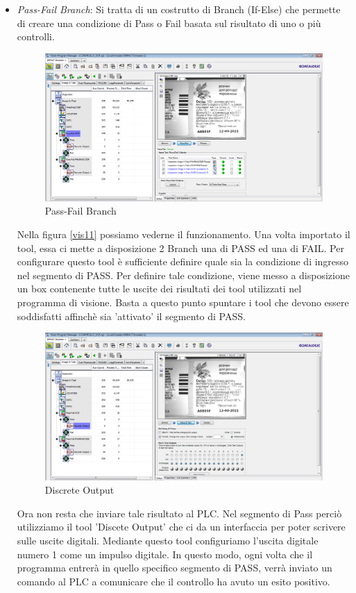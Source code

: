 \documentclass[12pt, a4paper, oneside]{book}
\begin{document}
\begin{itemize}
	\item \textit{Pass-Fail Branch}: Si tratta di un costrutto di Branch (If-Else) che permette di creare una condizione di Pass o Fail basata sul risultato di uno o più controlli.
	
			\begin{figure}[H]
		\centering
		\includegraphics[width=13cm]{Immagini/VIS12}
		\caption{Pass-Fail Branch}
		\label{vis12}
			\end{figure}
		
		Nella figura \ref{vis11} possiamo vederne il funzionamento. Una volta importato il tool, essa ci mette a disposizione 2 Branch una di PASS ed una di FAIL. Per configurare questo tool è sufficiente definire quale sia la condizione di ingresso nel segmento di PASS. Per definire tale condizione, viene messo a disposizione un box contenente tutte le uscite dei risultati dei tool utilizzati nel programma di visione. Basta a questo punto spuntare i tool che devono essere soddisfatti affinchè sia 'attivato' il segmento di PASS.
		
		\begin{figure}[H]
			\centering
			\includegraphics[width=13cm]{Immagini/VIS13}
			\caption{Discrete Output}
			\label{vis13}
		\end{figure}
	
		Ora non resta che inviare tale risultato al PLC. Nel segmento di Pass perciò utilizziamo il tool 'Discete Output' che ci da un interfaccia per poter scrivere sulle uscite digitali. Mediante questo tool configuriamo l'uscita digitale numero 1 come un impulso digitale. In questo modo, ogni volta che il programma entrerà in quello specifico segmento di PASS, verrà inviato un comando al PLC a comunicare che il controllo ha avuto un esito positivo.
		
		 
\end{itemize}
\end{document}
